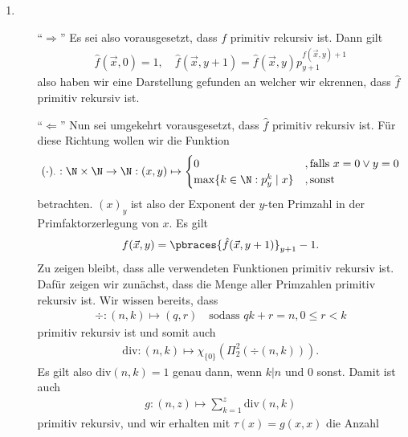 \begin{solution}

\phantom{}
\begin{enumerate}[label = (\alph*)]
	\item
		\begin{enumerate}
			\item[``$\Rightarrow$''] Es sei also vorausgesetzt, dass $f$ primitiv rekursiv ist. Dann gilt
				\begin{align*}
				\hat{f}(\vec{x},0) = 1, \quad \hat{f}(\vec{x}, y + 1) = \hat{f}(\vec{x},y)p_{y+1}^{f(\vec{x}, y) + 1}
				\end{align*}
				also haben wir eine Darstellung gefunden an welcher wir ekrennen, dass $\hat{f}$ primitiv rekursiv ist.
			\item[``$\Leftarrow$''] Nun sei umgekehrt vorausgesetzt, dass $\hat{f}$ primitiv rekursiv ist. Für diese Richtung wollen wir die Funktion
				\begin{align*}
				(\cdot)_\cdot : \N \times \N \to \N : (x,y) \mapsto
				\begin{cases}
				0 &, \text{falls } x = 0 \lor y = 0 \\
				\max\{k \in \N : p_y^k \mid x \} &, \text{sonst}
				\end{cases}
				\end{align*}
				betrachten. $(x)_y$ ist also der Exponent der $y$-ten Primzahl in der Primfaktorzerlegung von $x$. Es gilt
				\begin{align*}
				f(\vec{x},y) = \pbraces{\hat{f}(\vec{x}, y + 1)}_{y + 1} - 1.
				\end{align*}
				Zu zeigen bleibt, dass alle verwendeten Funktionen primitiv rekursiv ist.
				Dafür zeigen wir zunächst, dass die Menge aller Primzahlen primitiv rekursiv
				ist. Wir wissen bereits, dass
				\begin{align*}
					\div: (n,k) \mapsto (q,r) \quad \text{sodass } qk + r = n, 0 \leq r < k
				\end{align*}
				primitiv rekursiv ist und somit auch
				\begin{align*}
					\mathrm{div}: (n,k) \mapsto \chi_{\{0\}}(\Pi_2^2(\div(n,k))).
				\end{align*}
				Es gilt also $\mathrm{div}(n,k) = 1$ genau dann, wenn $k | n$ und $0$ sonst.
				Damit ist auch
				\begin{align*}
					g: (n,z) \mapsto \sum_{k=1}^z \mathrm{div}(n,k)
				\end{align*}
				primitiv rekursiv, und wir erhalten mit $\tau(x) = g(x,x)$ die Anzahl

\end{enumerate}
\end{enumerate}
\end{solution}
